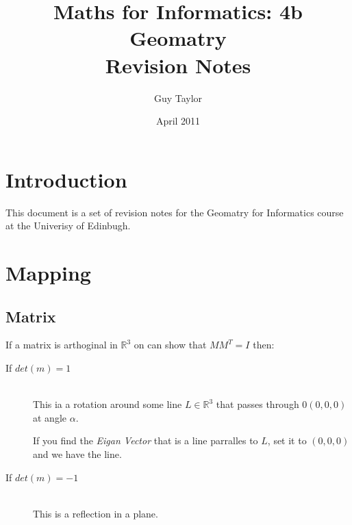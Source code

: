 \documentclass[11pt,twoside,a4paper]{article}
\begin{document}
  
  \graphicspath{{img//}}
  
  \title{Maths for Informatics: 4b Geomatry \\Revision Notes}
  \author{Guy Taylor}
  \date{April 2011}
  
  \maketitle
  
  \tableofcontents
  
  \section{Introduction}
    This document is a set of revision notes for the Geomatry for Informatics course at the Univerisy of Edinbugh.
  
  \clearpage
  \section{Mapping}
    \subsection{Matrix}
      If a matrix is arthoginal in \(\mathbb{R}^3\) on can show that \(MM^T = I\) then:
      \begin{description}
        \item[If \(det(m) = 1\)] \hfill \\
          This ia a rotation around some line \(L \in \mathbb{R}^3\) that passes through \(0 (0,0,0)\) at angle \(\alpha\).
          
          If you find the \textit{Eigan Vector} that is a line parralles to \(L\), set it to \((0,0,0)\) and we have the line.
        
        \item[If \(det(m) = -1\)] \hfill \\
          This is a reflection in a plane.
      \end{description}
  
\end{document}
